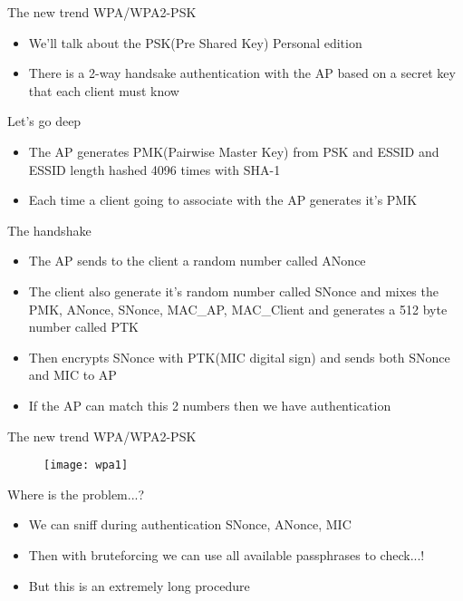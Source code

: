 \documentclass{beamer}
\begin{document}
\begin{frame}{The new trend WPA/WPA2-PSK }
 \begin{itemize}
 \pause \item We'll talk about the PSK(Pre Shared Key) Personal edition
\pause \item There is a 2-way handsake authentication with the AP based on a secret key that each client must
know
 \end{itemize}
\end{frame}

\begin{frame}{Let's go deep}
 \begin{itemize}
 \pause \item The AP generates PMK(Pairwise Master Key) from PSK and ESSID and ESSID length hashed 4096 times with SHA-1
\pause \item Each time a client going to associate with the AP generates it's PMK
 \end{itemize}
\end{frame}

\begin{frame}{The handshake }
 \begin{itemize}
 \pause \item The AP sends to the client a random number called ANonce
\pause \item The client also generate it's random number called SNonce and mixes the PMK, ANonce, SNonce, MAC\_AP,
MAC\_Client and generates a 512 byte number called PTK 
\pause \item Then encrypts SNonce with PTK(MIC digital sign) and sends both SNonce and MIC to AP
\pause \item If the AP can match this 2 numbers then we have authentication
 \end{itemize}
\end{frame}

\begin{frame}{The new trend WPA/WPA2-PSK }
 \begin{figure}
  \texttt{[image: wpa1]}
 \end{figure}
\end{frame}

\begin{frame}{Where is the problem...? }
 \begin{itemize}
 \pause \item We can sniff during authentication SNonce, ANonce, MIC
\pause \item Then with bruteforcing we can use all available passphrases to check...!
\pause \item But this is an extremely long procedure
 \end{itemize}
\end{frame}
\end{document}

